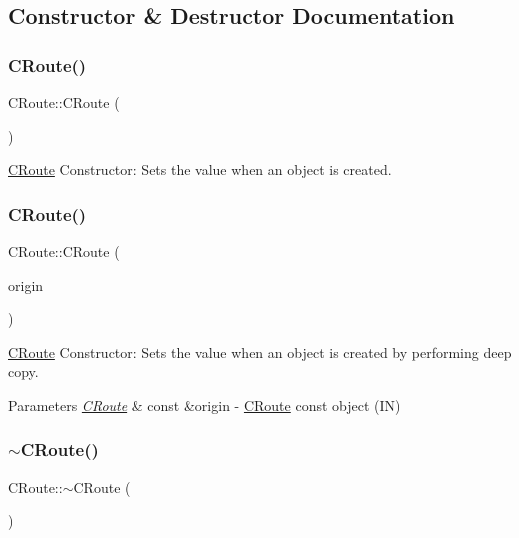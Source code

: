\subsection{Constructor \& Destructor Documentation}
\mbox{\label{classCRoute_a279642bf28bce1bb9865317db93bb08b}} 
\subsubsection{\texorpdfstring{C\+Route()}{CRoute()}\hspace{0.1cm}{\footnotesize\ttfamily [1/2]}}
{\footnotesize\ttfamily C\+Route\+::\+C\+Route (\begin{DoxyParamCaption}{ }\end{DoxyParamCaption})}

\hyperlink{classCRoute}{C\+Route} Constructor\+: Sets the value when an object is created. \mbox{\label{classCRoute_a0f6fad7298482d4717380ec91a5d0bf9}} 
\subsubsection{\texorpdfstring{C\+Route()}{CRoute()}\hspace{0.1cm}{\footnotesize\ttfamily [2/2]}}
{\footnotesize\ttfamily C\+Route\+::\+C\+Route (\begin{DoxyParamCaption}\item[{\hyperlink{classCRoute}{C\+Route} const \&}]{origin }\end{DoxyParamCaption})}

\hyperlink{classCRoute}{C\+Route} Constructor\+: Sets the value when an object is created by performing deep copy. 
\begin{DoxyParams}{Parameters}
{\em \hyperlink{classCRoute}{C\+Route}} & const \&origin -\/ \hyperlink{classCRoute}{C\+Route} const object (IN) \\
\hline
\end{DoxyParams}
\mbox{\label{classCRoute_ac78e6d6f34788ee62f5d65b182cf1c2f}} 
\subsubsection{\texorpdfstring{$\sim$\+C\+Route()}{~CRoute()}}
{\footnotesize\ttfamily C\+Route\+::$\sim$\+C\+Route (\begin{DoxyParamCaption}{ }\end{DoxyParamCaption})}

